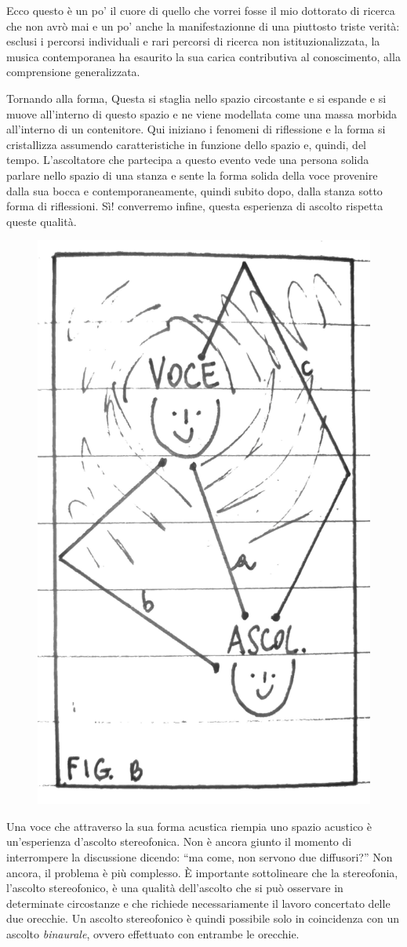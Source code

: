 Ecco questo è un po' il cuore di quello che vorrei fosse il mio dottorato di
ricerca che non avrò mai e un po' anche la manifestazionne di una piuttosto
triste verità: esclusi i percorsi individuali e rari percorsi di ricerca
non istituzionalizzata, la musica contemporanea ha esaurito la sua carica
contributiva al conoscimento, alla comprensione generalizzata.

Tornando alla forma, Questa si staglia nello spazio circostante e si espande e si muove
all'interno di questo spazio e ne viene modellata come una massa morbida all'interno
di un contenitore. Qui iniziano i fenomeni di riflessione e la forma si
cristallizza assumendo caratteristiche in funzione dello spazio e, quindi, del tempo.
L'ascoltatore che partecipa a questo evento vede una persona solida parlare nello
spazio di una stanza e sente la forma solida della voce provenire dalla sua bocca
e contemporaneamente, quindi subito dopo, dalla stanza sotto forma di riflessioni.
Sì! converremo infine, questa esperienza di ascolto rispetta queste qualità.

\begin{figure}[h]
\begin{center}
  \includegraphics[width=.48\linewidth]{CAPITOLI/1000/IMG/figb.png}
\label{ee:figa}
\end{center}
\end{figure}

Una voce che attraverso la sua forma acustica riempia uno spazio acustico è
un'esperienza d'ascolto stereofonica. Non è ancora giunto il momento di
interrompere la discussione dicendo: “ma come, non servono due diffusori?” Non
ancora, il problema è più complesso. È importante sottolineare che la stereofonia,
l'ascolto stereofonico, è una qualità dell'ascolto che si può osservare in
determinate circostanze e che richiede necessariamente il lavoro concertato delle
due orecchie. Un ascolto stereofonico è quindi possibile solo in coincidenza
con un ascolto \emph{binaurale}, ovvero effettuato con entrambe le orecchie.

